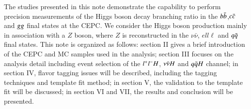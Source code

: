 The studies presented in this note demonstrate the capability to perform precision measurements of the Higgs boson decay branching ratio in the $b\bar{b}$,$c\bar{c}$ and $gg$ final states 
at the CEPC. We consider the Higgs boson production mainly in association with a $Z$ boson, where $Z$ is reconstructed in the $\nu\bar{\nu}$, $ell\ell$ and $q\bar{q}$ final states.
This note is organized as follows: section II gives a brief introduction of the CEPC and MC samples used in the analysis; section III focuses on the analysis detail including event selection 
of the $l^{+}l^{-}H$, $\nu \bar{\nu} H$ and $q\bar{q}H$ channel; in section IV, flavor tagging issues will be described, including the tagging techniques and template fit method; in section V, the validation to 
the template fit will be discussed; in section VI and VII, the results and conclusion will be presented.
\clearpage
